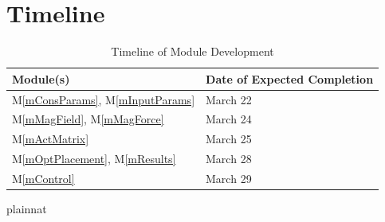 \documentclass[12pt, titlepage]{article}
\newcommand{\mref}[1]{M\ref{#1}}
\begin{document}
\section{Timeline}
\begin{table}[H]
\centering
\begin{tabular}{ m{5em} | m{4cm} } 
  \textbf{Module(s)}& \textbf{Date of Expected Completion} \\ 
  \hline
  \mref{mConsParams}, \mref{mInputParams} & March 22 \\ 
  \hline
  \mref{mMagField}, \mref{mMagForce} & March 24 \\ 
  \hline
  \mref{mActMatrix} & March 25 \\ 
  \hline
  \mref{mOptPlacement}, \mref{mResults} & March 28 \\ 
  \hline
  \mref{mControl} & March 29 \\ 
\end{tabular} 
\caption{Timeline of Module Development}
\label{Timeline}
\end{table}


 {plainnat}


\newpage{}
\end{document}
